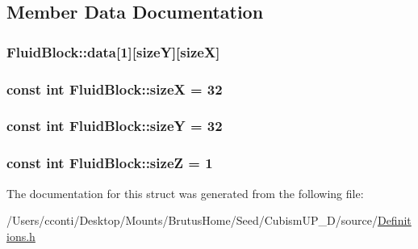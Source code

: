 \subsection{Member Data Documentation}
\hypertarget{struct_fluid_block_adaf63688f4901ef6640e3ee02aeabf42}{}
\subsubsection[{data}]{ Fluid\+Block\+::data\mbox{[}1\mbox{]}\mbox{[}{\bf size\+Y}\mbox{]}\mbox{[}{\bf size\+X}\mbox{]}}\label{struct_fluid_block_adaf63688f4901ef6640e3ee02aeabf42}
\hypertarget{struct_fluid_block_a4894f513519efdad2837a01cfb65f42e}{}
\subsubsection[{size\+X}]{\setlength{\rightskip}{0pt plus 5cm}const int Fluid\+Block\+::size\+X = 32\hspace{0.3cm}{\ttfamily [static]}}\label{struct_fluid_block_a4894f513519efdad2837a01cfb65f42e}
\hypertarget{struct_fluid_block_afd21ed464f6732be798bba7d87113bd2}{}
\subsubsection[{size\+Y}]{\setlength{\rightskip}{0pt plus 5cm}const int Fluid\+Block\+::size\+Y = 32\hspace{0.3cm}{\ttfamily [static]}}\label{struct_fluid_block_afd21ed464f6732be798bba7d87113bd2}
\hypertarget{struct_fluid_block_a7876602d8791ed7d4734fa20ad0a9574}{}
\subsubsection[{size\+Z}]{\setlength{\rightskip}{0pt plus 5cm}const int Fluid\+Block\+::size\+Z = 1\hspace{0.3cm}{\ttfamily [static]}}\label{struct_fluid_block_a7876602d8791ed7d4734fa20ad0a9574}


The documentation for this struct was generated from the following file\+:\begin{DoxyCompactItemize}
\item 
/\+Users/cconti/\+Desktop/\+Mounts/\+Brutus\+Home/\+Seed/\+Cubism\+U\+P\+\_\+D/source/\hyperlink{_definitions_8h}{Definitions.\+h}\end{DoxyCompactItemize}
